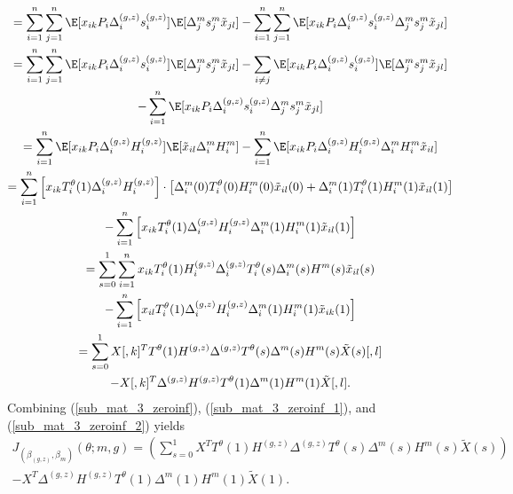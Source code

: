 \documentclass[12pt]{article}
\begin{document}
\begin{appendices}
\begin{multline}
= \sum_{i=1}^n \sum_{j=1}^n \E [x_{ik} P_i \Delta^{(g,z)}_i s^{(g,z)}_i] \E[\Delta^m_js^m_j \tilde{x}_{jl}] - \sum_{i=1}^n \sum_{j=1}^n \E[x_{ik} P_i \Delta^{(g,z)}_i s^{(g,z)}_i \Delta^m_j s^m_j \tilde{x}_{jl}] \\
= \sum_{i=1}^n \sum_{j=1}^n \E [x_{ik} P_i \Delta^{(g,z)}_i s^{(g,z)}_i ] \E[\Delta^m_js^m_j \tilde{x}_{jl}] - \sum_{i \neq j} \E [x_{ik} P_i \Delta^{(g,z)}_i s^{(g,z)}_i] \E[\Delta^m_js^m_j \tilde{x}_{jl}] \\ - \sum_{i=1}^n \E[x_{ik} P_i \Delta^{(g,z)}_i s^{(g,z)}_i \Delta^m_j s^m_j \tilde{x}_{jl}] \\
= \sum_{i=1}^n \E[x_{ik} P_i \Delta_i^{(g,z)} H^{(g,z)}_i] \E[\tilde{x}_{il} \Delta^m_i H^m_i] - \sum_{i=1}^n \E[x_{ik} P_i \Delta_i^{(g,z)} H_i^{(g,z)} \Delta_i^m H_i^m \tilde{x}_{il}] \\ 
= \sum_{i=1}^n \left[x_{ik} T_i^\theta(1) \Delta^{(g,z)}_i H^{(g,z)}_i \right] \cdot \left[{\Delta}^m_i(0) T^\theta_i(0) {H}^m_i(0) \tilde{x}_{il}(0) + {\Delta}^m_i(1) T_i^\theta(1) {H}^m_i(1) \tilde{x}_{il}(1)\right]
\\ - \sum_{i=1}^n \left[x_{ik} T_i^\theta(1) \Delta^{(g,z)}_i H^{(g,z)}_i \Delta^m_i(1) H^m_i(1) \tilde{x}_{il}(1)\right] 
\\ = \sum_{s=0}^1 \sum_{i=1}^n x_{ik} T_i^\theta(1) H_i^{(g,z)} \Delta_i^{(g,z)} T^\theta_i(s) \Delta_i^m(s) H^m(s) \tilde{x}_{il}(s) \\ - \sum_{i=1}^n \left[x_{il}T_i^\theta(1) \Delta^{(g,z)}_i H^{(g,z)}_i \Delta^m_i(1) H^m_i(1) \tilde{x}_{ik}(1)\right] \\ = \sum_{s=0}^1 X[,k]^T T^\theta(1) H^{(g,z)} \Delta^{(g,z)} T^\theta(s)\Delta^m(s)H^m(s) \tilde{X}(s)[,l] \\ - X[,k]^T \Delta^{(g,z)} H^{(g,z)} T^\theta(1)\Delta^m(1) H^m(1) \tilde{X}[,l].
\end{multline}
Combining (\ref{sub_mat_3_zeroinf}), (\ref{sub_mat_3_zeroinf_1}), and (\ref{sub_mat_3_zeroinf_2}) yields
\begin{multline}\label{sub_mat_4_zeroinf_formula} J_{(\beta_{(g,z)}, \beta_m)}(\theta; m, g) = \left(\sum_{s=0}^1 X^T  T^\theta(1) H^{(g,z)} \Delta^{(g,z)} T^\theta(s) \Delta^m(s) H^m(s) \tilde{X}(s) \right) \\ - X^T \Delta^{(g,z)} H^{(g,z)} T^\theta(1) \Delta^m(1)H^m(1) \tilde{X}(1).
\end{multline}


\end{appendices}
\end{document}
